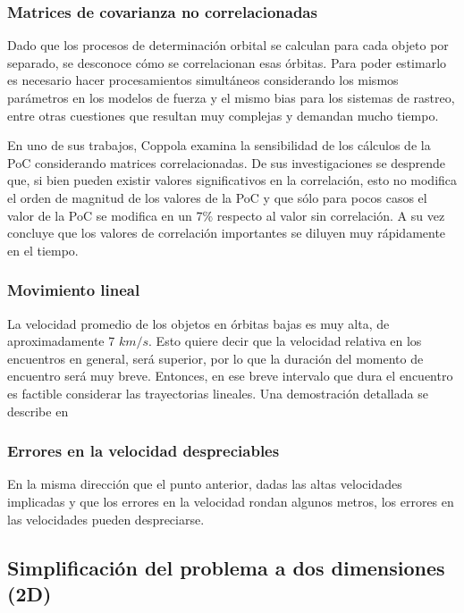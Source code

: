 \subsubsection*{Matrices de covarianza no correlacionadas}
Dado que los procesos de determinaci\'on orbital se calculan para cada objeto por separado, se desconoce c\'omo se correlacionan esas \'orbitas. Para poder estimarlo es necesario hacer procesamientos simult\'aneos considerando los mismos par\'ametros en los modelos de fuerza y el mismo bias para los sistemas de rastreo, entre otras cuestiones que resultan muy complejas y demandan mucho tiempo.

En uno de sus trabajos, Coppola \citep{coppola2004effects} examina la sensibilidad de los c\'alculos de la PoC considerando matrices correlacionadas. De sus investigaciones se desprende que, si bien pueden existir valores significativos en la correlaci\'on, esto no modifica el orden de magnitud de los valores de la PoC y que s\'olo para pocos casos el valor de la PoC se modifica en un 7$\%$ respecto al valor sin correlaci\'on. A su vez concluye que los valores de correlaci\'on importantes se diluyen muy r\'apidamente en el tiempo.

\subsubsection*{Movimiento lineal}
La velocidad promedio de los objetos en \'orbitas bajas es muy alta, de aproximadamente 7 $km/s$. Esto quiere decir que la velocidad relativa en los encuentros en general, ser\'a superior, por lo que la duraci\'on del momento de encuentro ser\'a muy breve. Entonces, en ese breve intervalo que dura el encuentro es factible considerar las trayectorias lineales. Una demostraci\'on detallada se describe en \citep{arrufat2013study}

\subsubsection*{Errores en la velocidad despreciables}
En la misma direcci\'on que el punto anterior, dadas las altas velocidades implicadas y que los errores en la velocidad rondan algunos metros, los errores en las velocidades pueden despreciarse. 

\subsection{Simplificaci\'on del problema a dos dimensiones (2D)}

